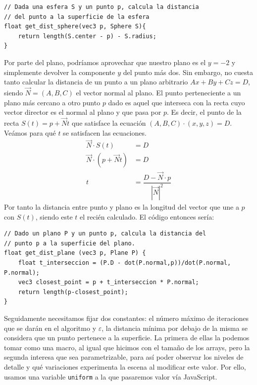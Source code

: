 \begin{lstlisting}
// Dada una esfera S y un punto p, calcula la distancia
// del punto a la superficie de la esfera
float get_dist_sphere(vec3 p, Sphere S){
    return length(S.center - p) - S.radius;
}
\end{lstlisting}

Por parte del plano, podríamos aprovechar que nuestro plano es el $y=-2$ y simplemente devolver la componente $y$ del punto más dos. Sin embargo, no cuesta tanto calcular la distancia de un punto a un plano arbitrario $Ax+By+Cz = D$, siendo $\vec N=(A,B,C)$ el vector normal al plano. El punto perteneciente a un plano más cercano a otro punto $p$ dado es aquel que interseca con la recta cuyo vector director es el normal al plano y que pasa por $p$. Es decir, el punto de la recta $S(t)=p+\vec Nt$ que satisface la ecuación $(A,B,C)\cdot (x,y,z) = D$. Veámos para qué $t$ se satisfacen las ecuaciones.
\begin{equation}
    \begin{split}
        \vec N\cdot S(t) &= D \\
        \vec N\cdot (p+\vec N t) &= D \\
        t &= \dfrac{D-\vec N \cdot p}{|\vec N|^2}
    \end{split}
\end{equation}
Por tanto la distancia entre punto y plano es la longitud del vector que une a $p$ con $S(t)$, siendo este $t$ el recién calculado. El código entonces sería:
\begin{lstlisting}
// Dado un plano P y un punto p, calcula la distancia del 
// punto p a la superficie del plano.
float get_dist_plane (vec3 p, Plane P) {
    float t_interseccion = (P.D - dot(P.normal,p))/dot(P.normal, P.normal);
    vec3 closest_point = p + t_interseccion * P.normal;
    return length(p-closest_point);
}
\end{lstlisting}

Seguidamente necesitamos fijar dos constantes: el número máximo de iteraciones que se darán en el algoritmo y $\varepsilon$, la distancia mínima por debajo de la misma se considera que un punto pertenece a la superficie. La primera de ellas la podemos tomar como una macro, al igual que hicimos con el tamaño de los arrays, pero la segunda interesa que sea parametrizable, para así poder observar los niveles de detalle y qué variaciones experimenta la escena al modificar este valor. Por ello, usamos una variable \verb|uniform| a la que pasaremos valor vía JavaScript.

